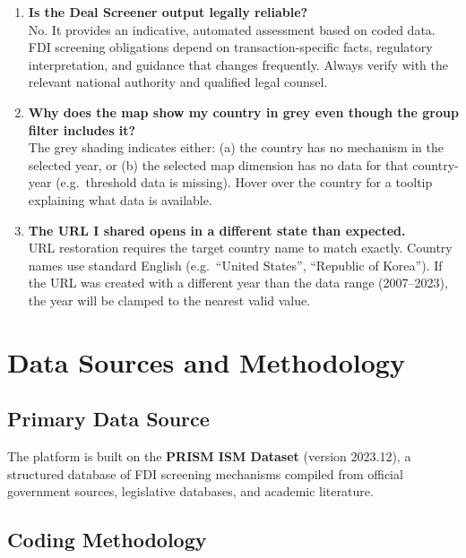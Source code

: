 \documentclass[12pt,a4paper]{article}
\begin{document}
\begin{enumerate}[label=\textbf{Q\arabic*.}]
\item \textbf{Is the Deal Screener output legally reliable?}\\
No. It provides an indicative, automated assessment based on coded data. FDI screening obligations depend on transaction-specific facts, regulatory interpretation, and guidance that changes frequently. Always verify with the relevant national authority and qualified legal counsel.

\item \textbf{Why does the map show my country in grey even though the group filter includes it?}\\
The grey shading indicates either: (a) the country has no mechanism in the selected year, or (b) the selected map dimension has no data for that country-year (e.g.\ threshold data is missing). Hover over the country for a tooltip explaining what data is available.

\item \textbf{The URL I shared opens in a different state than expected.}\\
URL restoration requires the target country name to match exactly. Country names use standard English (e.g.\ ``United States'', ``Republic of Korea''). If the URL was created with a different year than the data range (2007--2023), the year will be clamped to the nearest valid value.

\end{enumerate}

\section{Data Sources and Methodology}
\label{sec:methodology}

\subsection{Primary Data Source}

The platform is built on the \textbf{PRISM ISM Dataset} (version 2023.12), a structured database of FDI screening mechanisms compiled from official government sources, legislative databases, and academic literature.

\subsection{Coding Methodology}
\end{document}
